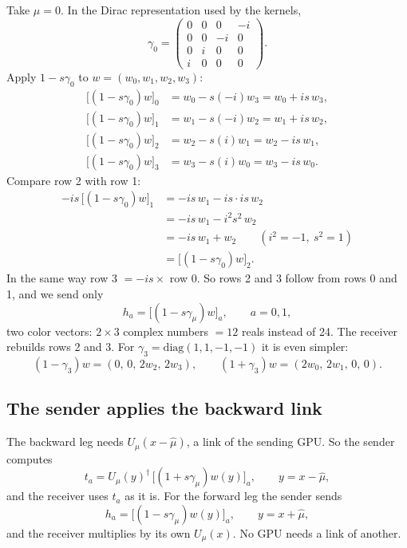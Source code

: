 \documentclass[11pt,a4paper]{article}
\numberwithin{equation}{section}
\newcommand{\dg}{^{\dagger}}
\begin{document}
Take $\mu=0$. In the Dirac representation used by the kernels,
\begin{equation}
\gamma_0=\begin{pmatrix}0&0&0&-i\\0&0&-i&0\\0&i&0&0\\i&0&0&0\end{pmatrix}.
\end{equation}
Apply $1-s\gamma_0$ to $w=(w_0,w_1,w_2,w_3)$:
\begin{align}
\big[(1-s\gamma_0)w\big]_0 &= w_0 - s(-i)w_3 = w_0 + is\,w_3,\\
\big[(1-s\gamma_0)w\big]_1 &= w_1 - s(-i)w_2 = w_1 + is\,w_2,\\
\big[(1-s\gamma_0)w\big]_2 &= w_2 - s(i)w_1 = w_2 - is\,w_1,\\
\big[(1-s\gamma_0)w\big]_3 &= w_3 - s(i)w_0 = w_3 - is\,w_0.
\end{align}
Compare row 2 with row 1:
\begin{align}
-is\,\big[(1-s\gamma_0)w\big]_1 &= -is\,w_1 - is\cdot is\,w_2\\
&= -is\,w_1 - i^2 s^2\,w_2\\
&= -is\,w_1 + w_2 \qquad (i^2=-1,\ s^2=1)\\
&= \big[(1-s\gamma_0)w\big]_2 .
\end{align}
In the same way row 3 $= -is\times$ row 0. So rows 2 and 3 follow from rows 0 and 1, and we
send only
\begin{equation}
h_a = \big[(1-s\gamma_\mu)w\big]_a,\qquad a=0,1,
\end{equation}
two color vectors: $2\times3$ complex numbers $=12$ reals instead of 24. The receiver rebuilds
rows 2 and 3. For $\gamma_3=\mathrm{diag}(1,1,-1,-1)$ it is even simpler:
\begin{equation}
(1-\gamma_3)w = (0,\,0,\,2w_2,\,2w_3),\qquad (1+\gamma_3)w = (2w_0,\,2w_1,\,0,\,0).
\end{equation}

\subsection{The sender applies the backward link}

The backward leg needs $U_\mu(x-\hat\mu)$, a link of the sending GPU. So the sender computes
\begin{equation}
t_a = U_\mu(y)\dg\,\big[(1+s\gamma_\mu)w(y)\big]_a,\qquad y = x-\hat\mu,
\end{equation}
and the receiver uses $t_a$ as it is. For the forward leg the sender sends
\begin{equation}
h_a = \big[(1-s\gamma_\mu)w(y)\big]_a,\qquad y=x+\hat\mu,
\end{equation}
and the receiver multiplies by its own $U_\mu(x)$. No GPU needs a link of another.
\end{document}
